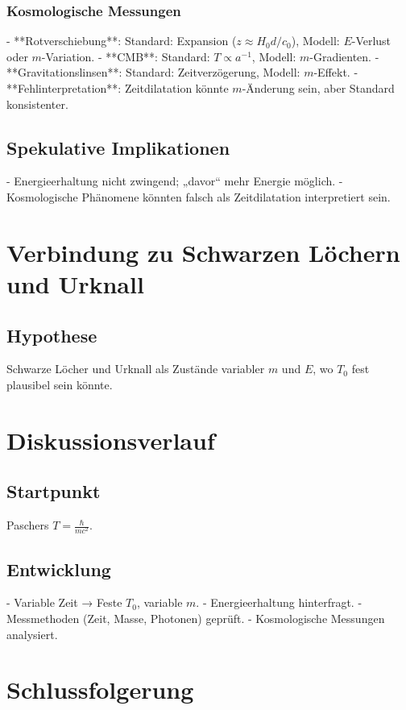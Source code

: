 \documentclass{article}
\begin{document}
	\subsubsection{Kosmologische Messungen}
	- **Rotverschiebung**: Standard: Expansion (\( z \approx H_0 d / c_0 \)), Modell: \( E \)-Verlust oder \( m \)-Variation.
	- **CMB**: Standard: \( T \propto a^{-1} \), Modell: \( m \)-Gradienten.
	- **Gravitationslinsen**: Standard: Zeitverzögerung, Modell: \( m \)-Effekt.
	- **Fehlinterpretation**: Zeitdilatation könnte \( m \)-Änderung sein, aber Standard konsistenter.
	
	\subsection{Spekulative Implikationen}
	
	- Energieerhaltung nicht zwingend; „davor“ mehr Energie möglich.
	- Kosmologische Phänomene könnten falsch als Zeitdilatation interpretiert sein.
	
	\section{Verbindung zu Schwarzen Löchern und Urknall}
	
	\subsection{Hypothese}
	Schwarze Löcher und Urknall als Zustände variabler \( m \) und \( E \), wo \( T_0 \) fest plausibel sein könnte.
	
	\section{Diskussionsverlauf}
	
	\subsection{Startpunkt}
	Paschers \( T = \frac{\hbar}{mc^2} \).
	
	\subsection{Entwicklung}
	- Variable Zeit → Feste \( T_0 \), variable \( m \).
	- Energieerhaltung hinterfragt.
	- Messmethoden (Zeit, Masse, Photonen) geprüft.
	- Kosmologische Messungen analysiert.
	
	\section{Schlussfolgerung}
	
\end{document}
